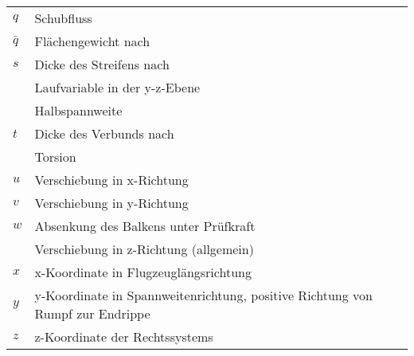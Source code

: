 \begin{longtable}[l]{ll}
	$ q $&Schubfluss\\
	$ \bar{q} $&Flächengewicht nach \cite{item5}\\
	$ s $&Dicke des Streifens nach \cite{item1}\\
	&Laufvariable in der y-z-Ebene\\
	&Halbspannweite\\
	$ t $&Dicke des Verbunds nach \cite{item3}\\
	&Torsion\\
	$u$&Verschiebung in x-Richtung\\
	$v$&Verschiebung in y-Richtung\\
	$ w $&Absenkung des Balkens unter Prüfkraft\\
	&Verschiebung in z-Richtung (allgemein)\\
	$ x $&x-Koordinate in Flugzeuglängsrichtung\\
	$ y $&y-Koordinate in Spannweitenrichtung, positive Richtung von Rumpf zur Endrippe\\
	$ z $&z-Koordinate der Rechtssystems
\end{longtable}


